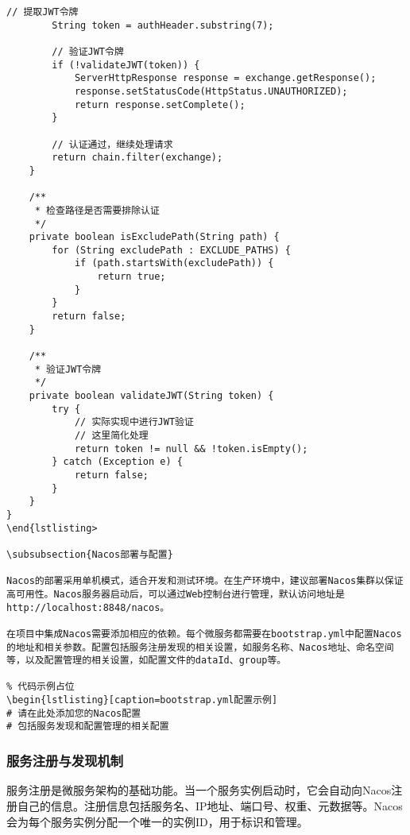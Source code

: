 \documentclass[a4paper,12pt]{article}
\begin{document}
\begin{lstlisting}[caption=JWT认证过滤器]
        // 提取JWT令牌
        String token = authHeader.substring(7);
        
        // 验证JWT令牌
        if (!validateJWT(token)) {
            ServerHttpResponse response = exchange.getResponse();
            response.setStatusCode(HttpStatus.UNAUTHORIZED);
            return response.setComplete();
        }
        
        // 认证通过，继续处理请求
        return chain.filter(exchange);
    }
    
    /**
     * 检查路径是否需要排除认证
     */
    private boolean isExcludePath(String path) {
        for (String excludePath : EXCLUDE_PATHS) {
            if (path.startsWith(excludePath)) {
                return true;
            }
        }
        return false;
    }
    
    /**
     * 验证JWT令牌
     */
    private boolean validateJWT(String token) {
        try {
            // 实际实现中进行JWT验证
            // 这里简化处理
            return token != null && !token.isEmpty();
        } catch (Exception e) {
            return false;
        }
    }
}
\end{lstlisting>

\subsubsection{Nacos部署与配置}

Nacos的部署采用单机模式，适合开发和测试环境。在生产环境中，建议部署Nacos集群以保证高可用性。Nacos服务器启动后，可以通过Web控制台进行管理，默认访问地址是http://localhost:8848/nacos。

在项目中集成Nacos需要添加相应的依赖。每个微服务都需要在bootstrap.yml中配置Nacos的地址和相关参数。配置包括服务注册发现的相关设置，如服务名称、Nacos地址、命名空间等，以及配置管理的相关设置，如配置文件的dataId、group等。

% 代码示例占位
\begin{lstlisting}[caption=bootstrap.yml配置示例]
# 请在此处添加您的Nacos配置
# 包括服务发现和配置管理的相关配置
\end{lstlisting}

\subsubsection{服务注册与发现机制}

服务注册是微服务架构的基础功能。当一个服务实例启动时，它会自动向Nacos注册自己的信息。注册信息包括服务名、IP地址、端口号、权重、元数据等。Nacos会为每个服务实例分配一个唯一的实例ID，用于标识和管理。
\end{document}
